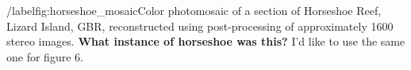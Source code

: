 /label{fig:horseshoe_mosaic}Color photomosaic of a section of Horseshoe Reef, Lizard Island, GBR, reconstructed using post-processing of approximately 1600 stereo images. \textbf{What instance of horseshoe was this? } I'd like to use the same one for figure 6.